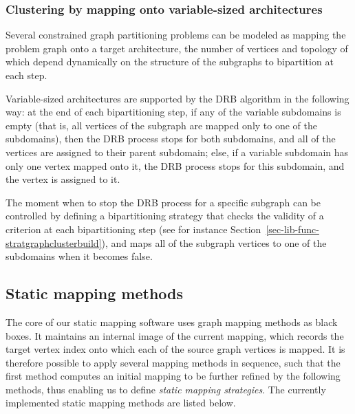 \subsubsection{Clustering by mapping onto variable-sized architectures}
\label{sec-algo-variable}

Several constrained graph partitioning problems can be modeled as
mapping the problem graph onto a target architecture, the number of
vertices and topology of which depend dynamically on the structure of
the subgraphs to bipartition at each step.

Variable-sized architectures are supported by the DRB algorithm in the
following way: at the end of each bipartitioning step, if any of the
variable subdomains is empty (that is, all vertices of the subgraph
are mapped only to one of the subdomains), then the DRB process stops
for both subdomains, and all of the vertices are assigned to their
parent subdomain; else, if a variable subdomain has only one vertex
mapped onto it, the DRB process stops for this subdomain, and the
vertex is assigned to it.

The moment when to stop the DRB process for a specific subgraph can be
controlled by defining a bipartitioning strategy that checks the
validity of a criterion at each bipartitioning step (see for instance
Section~\ref{sec-lib-func-stratgraphclusterbuild}), and maps all of
the subgraph vertices to one of the subdomains when it becomes false.

\subsection{Static mapping methods}
\label{sec-algo-map-methods}

The core of our static mapping software uses graph mapping methods as
black boxes. It maintains an internal image of the current mapping,
which records the target vertex index onto which each of the source
graph vertices is mapped. It is therefore possible to apply several
mapping methods in sequence, such that the first method computes an
initial mapping to be further refined by the following methods, thus
enabling us to define \emph{static mapping strategies}. The currently
implemented static mapping methods are listed below.

